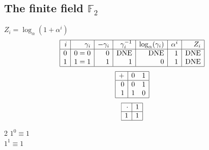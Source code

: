 \subsection*{The finite field ${\mathbb F}_{2}$}
\small
$Z_i = \log_\alpha (1 + \alpha^i)$\\
$$\begin{array}{|*{7}{r|}}
\hline
i & \gamma_i & -\gamma_i& \gamma_i^{-1}& \log_\alpha(\gamma_i)& \alpha^i& Z_i\\
\hline
  0 & 0 = 0 &0 & \mbox{DNE} & \mbox{DNE} &1 & \mbox{DNE}\\
  1 &   1 = 1 &1 &1 &0 &1 & \mbox{DNE}\\
\hline
\end{array}
$$
$$
\begin{array}{|r|*{2}{r}|}
\hline
+  &         0 &         1\\
\hline
         0&         0&         1\\
         1&         1&         0\\
\hline
\end{array}
$$
$$
\begin{array}{|r|*{1}{r}|}
\hline
\cdot  &         1\\
\hline
         1&         1\\
\hline
\end{array}
$$
\begin{multicols}{2}
\noindent
$1^{0} \equiv 1$\\
$1^{1} \equiv 1$\\
\end{multicols}

\bigskip

